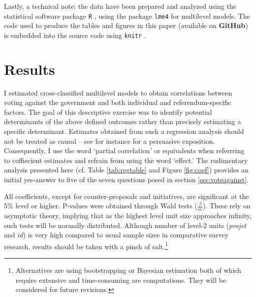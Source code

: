 \documentclass[11pt,a4paper]{article}\usepackage[]{graphicx}\usepackage[]{color}
\begin{document}
    
    
    Lastly, a technical note: the data have been prepared and analyzed using the statistical software package \texttt{R} \citep{r_core_team_r:_2014}, using the package \texttt{lme4} \citep{bates_lme4:_2014} for multilevel models. The code used to produce the tables and figures in this paper (available on \textbf{GitHub}) is embedded into the source code using \texttt{knitr} \citep{xie_knitr:_2014}.
    
    \section{Results}\label{sec:results}
    I estimated cross-classified multilevel models to obtain correlations between voting against the government and both individual and referendum-specific factors. The goal of this descriptive exercise was to identify potential determinants of the above defined outcomes rather than precisely estimating a specific determinant. Estimates obtained from such a regression analysis should not be treated as causal -- see for instance \citet{keele_perils_2014} for a persuasive exposition. Consequently, I use the word `partial correlation' or equivalents when referrring to coffiecient estimates and refrain from using the word `effect.' The rudimentary analysis presented here (cf. Table \ref{tab:regtable} and Figure \ref{fig:coef}) provides an initial yes-answer to five of the seven questions posed in section \ref{sec:voteagainst}.
    
    All coefficients, except for counter-proposals and initiatives, are significant at the 5\% level or higher. P-values were obtained through Wald tests ($\frac{\beta}{se}$). These rely on asymptotic theory, implying that as the highest level unit size approaches infinity, such tests will be normally distributed. Although number of level-2 units (\textit{projet} and \textit{id}) is very high compared to usual sample sizes in comparative survey research, results should be taken with a pinch of salt.\footnote{Alternatives are using bootstrapping or Bayesian estimation both of which require extensive and time-consuming are computations. They will be considered for future revisions.} %
    
\end{document}
